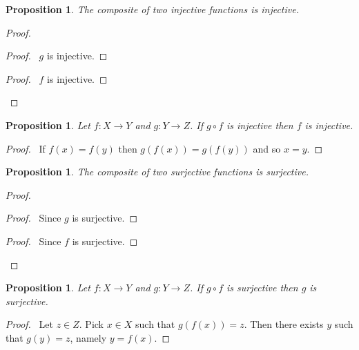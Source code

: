 \documentclass{report}
\let\qed\relax
\newtheorem{prop}[ax]{Proposition}
\theoremstyle{definition}
\begin{document}
\begin{prop}
\label{prop:comp_inj}
The composite of two injective functions is injective.
\end{prop}

\begin{proof}
\pf
{}
\begin{proof}
	\pf\ $g$ is injective.
\end{proof}
\begin{proof}
	\pf\ $f$ is injective.
\end{proof}
\qed
\end{proof}

\begin{prop}
Let $f : X \rightarrow Y$ and $g : Y \rightarrow Z$. If $g \circ f$ is injective then $f$ is injective.
\end{prop}

\begin{proof}
\pf\ If $f(x) = f(y)$ then $g(f(x)) = g(f(y))$ and so $x = y$. \qed
\end{proof}

\begin{prop}
\label{prop:comp_surj}
The composite of two surjective functions is surjective.
\end{prop}

\begin{proof}
\pf
{}
\begin{proof}
	\pf\ Since $g$ is surjective.
\end{proof}
\begin{proof}
	\pf\ Since $f$ is surjective.
\end{proof}
\qed
\end{proof}

\begin{prop}
Let $f : X \rightarrow Y$ and $g : Y \rightarrow Z$. If $g \circ f$ is surjective then $g$ is surjective.
\end{prop}

\begin{proof}
\pf\ Let $z \in Z$. Pick $x \in X$ such that $g(f(x)) = z$. Then there exists $y$ such that $g(y) = z$, namely $y = f(x)$. \qed
\end{proof}
\end{document}
